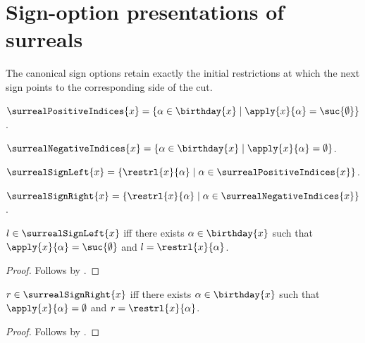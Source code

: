

\section{Sign-option presentations of surreals}

The canonical sign options retain exactly the initial restrictions at which
the next sign points to the corresponding side of the cut.

\begin{definition}\label{surreal_positive_indices}
    $\surrealPositiveIndices{x}=
        \{\alpha\in\birthday{x}\mid
            \apply{x}{\alpha}=\suc{\emptyset}\}$.
\end{definition}

\begin{definition}\label{surreal_negative_indices}
    $\surrealNegativeIndices{x}=
        \{\alpha\in\birthday{x}\mid
            \apply{x}{\alpha}=\emptyset\}$.
\end{definition}

\begin{definition}\label{surreal_sign_left}
    $\surrealSignLeft{x}=
        \{\restrl{x}{\alpha}\mid
            \alpha\in\surrealPositiveIndices{x}\}$.
\end{definition}

\begin{definition}\label{surreal_sign_right}
    $\surrealSignRight{x}=
        \{\restrl{x}{\alpha}\mid
            \alpha\in\surrealNegativeIndices{x}\}$.
\end{definition}

\begin{proposition}\label{surreal_sign_left_iff}
    $l\in\surrealSignLeft{x}$ iff there exists $\alpha\in\birthday{x}$
        such that $\apply{x}{\alpha}=\suc{\emptyset}$ and
        $l=\restrl{x}{\alpha}$.
\end{proposition}
\begin{proof}
    Follows by .
\end{proof}

\begin{proposition}\label{surreal_sign_right_iff}
    $r\in\surrealSignRight{x}$ iff there exists $\alpha\in\birthday{x}$
        such that $\apply{x}{\alpha}=\emptyset$ and
        $r=\restrl{x}{\alpha}$.
\end{proposition}
\begin{proof}
    Follows by .
\end{proof}


